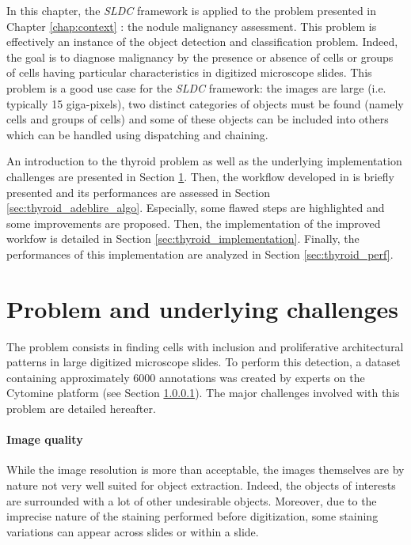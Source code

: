 \label{chap:thyroid}
In this chapter, the \textit{SLDC} framework is applied to the problem presented in Chapter \ref{chap:context} : the nodule malignancy assessment. This problem is effectively an instance of the object detection and classification problem. Indeed, the goal is to diagnose malignancy by the presence or absence of cells or groups of cells having particular characteristics in digitized microscope slides. This problem is a good use case for the \textit{SLDC} framework: the images are large (i.e. typically 15 giga-pixels), two distinct categories of objects must be found (namely cells and groups of cells) and some of these objects can be included into others which can be handled using dispatching and chaining.  

An introduction to the thyroid problem as well as the underlying implementation challenges are presented in Section \ref{sec:thyroid_impl_issue}. Then, the workflow developed in \cite{adeblire2013} is briefly presented and its performances are assessed in Section \ref{sec:thyroid_adeblire_algo}. Especially, some flawed steps are highlighted and some improvements are proposed. Then, the implementation of the improved workfow is detailed in Section \ref{sec:thyroid_implementation}. Finally, the performances of this implementation are analyzed in Section \ref{sec:thyroid_perf}.

\section{Problem and underlying challenges}
\label{sec:thyroid_impl_issue}
The problem consists in finding cells with inclusion and proliferative architectural patterns in large digitized microscope slides. To perform this detection, a dataset containing approximately 6000 annotations was created by experts on the Cytomine platform (see Section \ref{}). The major challenges involved with this problem are detailed hereafter. 

\paragraph{Image quality} While the image resolution is more than acceptable, the images themselves are by nature not very well suited for object extraction. Indeed, the objects of interests are surrounded with a lot of other undesirable objects. Moreover, due to the imprecise nature of the staining performed before digitization, some staining variations can appear across slides or within a slide. 

